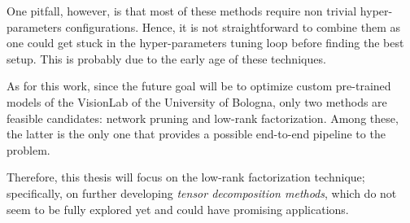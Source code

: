 One pitfall, however, is that most of these methods require non trivial hyper-parameters configurations. Hence, it is not straightforward to combine them as one could get stuck in the hyper-parameters tuning loop before finding the best setup. This is probably due to the early age of these techniques. 
\newline 

As for this work, since the future goal will be to optimize custom pre-trained models of the VisionLab of the University of Bologna, only two methods are feasible candidates: network pruning and low-rank factorization. Among these, the latter is the only one that provides a possible end-to-end pipeline to the problem. 
\newline 

Therefore, this thesis will focus on the low-rank factorization technique; specifically, on further developing \emph{tensor decomposition methods}, which do not seem to be fully explored yet and could have promising applications. 